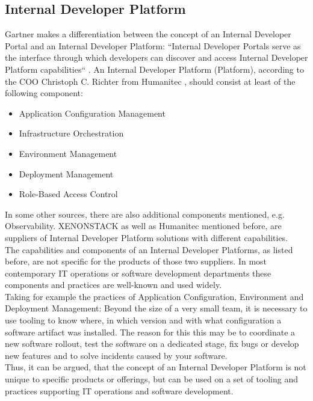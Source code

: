 \documentclass[a4paper,12pt]{article}
\begin{document}
    \subsection{Internal Developer Platform}
    \label{subsec:vpplatform}
    Gartner makes a differentiation between the concept of an Internal Developer Portal and an Internal Developer Platform:
    ``Internal Developer Portals serve as the interface through which developers can discover and
    access Internal Developer Platform capabilities``\parencite{gartner} .
    An Internal Developer Platform (Platform), according to the COO Christoph C. Richter from Humanitec\parencite{richteretal} ,
    should consist at least of the following component:
    \begin{itemize}
        \item Application Configuration Management
        \item Infrastructure Orchestration
        \item Environment Management
        \item Deployment Management
        \item Role-Based Access Control
    \end{itemize}
    In some other sources, there are also additional components mentioned, e.g. Observability\parencite{xenon}.
    XENONSTACK as well as Humanitec mentioned before, are suppliers of Internal Developer Platform solutions with
    different capabilities.\\
    The capabilities and components of an Internal Developer Platforms, as listed before,  are not specific for the products
    of those two suppliers.
    In most contemporary IT operations or software development departments these components and practices are well-known
    and used widely.\\
    Taking for example the practices of Application Configuration, Environment and Deployment Management:
    Beyond the size of a very small team, it is necessary to use tooling to know where, in which version
    and with what configuration a software artifact was installed.
    The reason for this this may be to coordinate a new software rollout, test the software on a dedicated stage, fix bugs
    or develop new features and to solve incidents caused by your software.\\
    Thus, it can be argued, that the concept of an Internal Developer Platform is not unique to specific products
    or offerings, but can be used on a set of tooling and practices supporting IT operations and software development.
\end{document}
